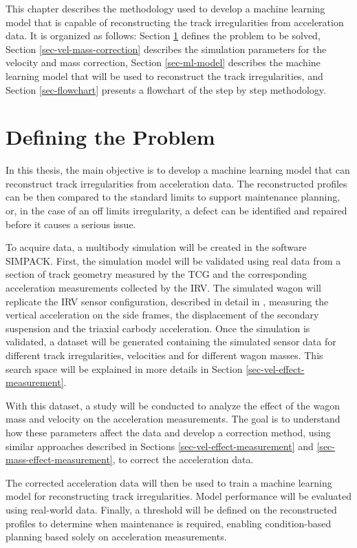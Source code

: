 This chapter describes the methodology used to develop a machine learning model that is capable of reconstructing the track irregularities from acceleration data. It is organized as follows: Section \ref{sec-defining-problem} defines the problem to be solved, Section \ref{sec-vel-mass-correction} describes the simulation parameters for the velocity and mass correction, Section \ref{sec-ml-model} describes the machine learning model that will be used to reconstruct the track irregularities, and Section \ref{sec-flowchart} presents a flowchart of the step by step methodology.

\section{Defining the Problem} \label{sec-defining-problem}

In this thesis, the main objective is to develop a machine learning model that can reconstruct track irregularities from acceleration data. The reconstructed profiles can be then compared to the standard limits to support maintenance planning, or, in the case of an off limits irregularity, a defect can be identified and repaired before it causes a serious issue.

To acquire data, a multibody simulation will be created in the software SIMPACK. First, the simulation model will be validated using real data from a section of track geometry measured by the TCG and the corresponding acceleration measurements collected by the IRV. The simulated wagon will replicate the IRV sensor configuration, described in detail in \cite{PIRES2024107191}, measuring the vertical acceleration on the side frames, the displacement of the secondary suspension and the triaxial carbody acceleration. Once the simulation is validated, a dataset will be generated containing the simulated sensor data for different track irregularities, velocities and for different wagon masses. This search space will be explained in more details in Section \ref{sec-vel-effect-measurement}.

With this dataset, a study will be conducted to analyze the effect of the wagon mass and velocity on the acceleration measurements. The goal is to understand how these parameters affect the data and develop a correction method, using similar approaches described in Sections \ref{sec-vel-effect-measurement} and \ref{sec-mass-effect-measurement}, to correct the acceleration data.

The corrected acceleration data will then be used to train a machine learning model for reconstructing track irregularities. Model performance will be evaluated using real-world data. Finally, a threshold will be defined on the reconstructed profiles to determine when maintenance is required, enabling condition-based planning based solely on acceleration measurements.

